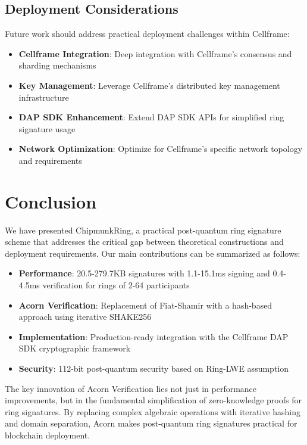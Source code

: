 \documentclass[11pt,a4paper]{article}
\begin{document}
\subsection{Deployment Considerations}

Future work should address practical deployment challenges within Cellframe:

\begin{itemize}
\item \textbf{Cellframe Integration}: Deep integration with Cellframe's consensus and sharding mechanisms
\item \textbf{Key Management}: Leverage Cellframe's distributed key management infrastructure
\item \textbf{DAP SDK Enhancement}: Extend DAP SDK APIs for simplified ring signature usage
\item \textbf{Network Optimization}: Optimize for Cellframe's specific network topology and requirements
\end{itemize}

\section{Conclusion}

We have presented ChipmunkRing, a practical post-quantum ring signature scheme that addresses the critical gap between theoretical constructions and deployment requirements. Our main contributions can be summarized as follows:

\begin{itemize}
\item \textbf{Performance}: 20.5-279.7KB signatures with 1.1-15.1ms signing and 0.4-4.5ms verification for rings of 2-64 participants
\item \textbf{Acorn Verification}: Replacement of Fiat-Shamir with a hash-based approach using iterative SHAKE256
\item \textbf{Implementation}: Production-ready integration with the Cellframe DAP SDK cryptographic framework
\item \textbf{Security}: 112-bit post-quantum security based on Ring-LWE assumption
\end{itemize}

The key innovation of Acorn Verification lies not just in performance improvements, but in the fundamental simplification of zero-knowledge proofs for ring signatures. By replacing complex algebraic operations with iterative hashing and domain separation, Acorn makes post-quantum ring signatures practical for blockchain deployment.
\end{document}
